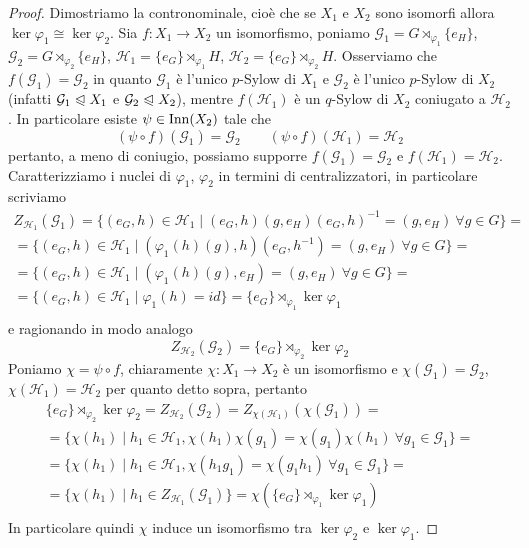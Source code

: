 \documentclass[11pt]{scrartcl}
\begin{document}
	\begin{proof}
		Dimostriamo la contronominale, cioè che se $X_1$ e $X_2$ sono isomorfi
		allora $\ker\varphi_1 \cong \ker\varphi_2$.\newline
		Sia $f: X_1\longrightarrow X_2$ un isomorfismo, poniamo $\mathcal{G}_1 = 
		G\rtimes_{\varphi_1}\{e_H\}$, $\mathcal{G}_2 = G\rtimes_{\varphi_2}\{e_H\}$,
		$\mathcal{H}_1 = \{e_G\}\rtimes_{\varphi_1}H$, $\mathcal{H}_2 = \{e_G\}\rtimes_{\varphi_2}H$.
		Osserviamo che $f(\mathcal{G}_1) = \mathcal{G}_2$ in quanto $\mathcal{G}_1$
		è l'unico $p$-Sylow di $X_1$ e $\mathcal{G}_2$ è l'unico $p$-Sylow di $X_2$
		(infatti $\mathcal{G}_1 \trianglelefteqslant X_1$ e $\mathcal{G}_2 
		\trianglelefteqslant X_2$), mentre $f(\mathcal{H}_1)$ è un $q$-Sylow di $X_2$
		coniugato a $\mathcal{H}_2$. In particolare esiste $\psi \in \operatorname{Inn}(X_2)$
		tale che
		\[
		(\psi\circ f)(\mathcal{G}_1) = \mathcal{G}_2 \qquad 
		(\psi\circ f)(\mathcal{H}_1) = \mathcal{H}_2
		\]
		pertanto, a meno di coniugio, possiamo supporre $f(\mathcal{G}_1) = \mathcal{G}_2$ e 
		$f(\mathcal{H}_1) = \mathcal{H}_2$. Caratterizziamo i nuclei di $\varphi_1$, 
		$\varphi_2$ in termini di centralizzatori, in particolare scriviamo
		\begin{multline*}
			Z_{\mathcal{H}_1}(\mathcal{G}_1) = \{(e_G, h) \in \mathcal{H}_1\mid
			(e_G, h)(g, e_H)(e_G, h)^{-1} = (g, e_H)~\forall g \in G\} = \\
			= \{(e_G, h)\in \mathcal{H}_1 \mid (\varphi_1(h)(g), h)(e_G, h^{-1})
			= (g, e_H)~\forall g \in G\} = \\
			= \{(e_G, h) \in \mathcal{H}_1\mid (\varphi_1(h)(g), e_H) = (g, e_H)~
			\forall g \in G\} = \\
			= \{(e_G, h) \in \mathcal{H}_1\mid \varphi_1(h) = id\} =
			\{e_G\}\rtimes_{\varphi_1}\ker\varphi_1\\
		\end{multline*}
		e ragionando in modo analogo
		\[
		Z_{\mathcal{H}_2}(\mathcal{G}_2) = \{e_G\}\rtimes_{\varphi_2}\ker\varphi_2
		\]
		Poniamo $\chi = \psi\circ f$, chiaramente $\chi: X_1\longrightarrow X_2$
		è un isomorfismo e $\chi(\mathcal{G}_1) = \mathcal{G}_2$, $\chi(\mathcal{H}_1)
		= \mathcal{H}_2$ per quanto detto sopra, pertanto
		\begin{multline*}
			\{e_G\}\rtimes_{\varphi_2}\ker\varphi_2 = Z_{\mathcal{H}_2}(\mathcal{G}_2) =
			Z_{\chi(\mathcal{H}_1)}(\chi(\mathcal{G}_1)) = \\
			= \{\chi(h_1) \mid h_1 \in \mathcal{H}_1, \chi(h_1)\chi(g_1) = 
			\chi(g_1)\chi(h_1)~\forall g_1 \in \mathcal{G}_1\} = \\
			= \{\chi(h_1)\mid h_1 \in \mathcal{H}_1, \chi(h_1g_1) = \chi(g_1h_1)
			~\forall g_1 \in \mathcal{G}_1\} = \\
			= \{\chi(h_1) \mid h_1 \in Z_{\mathcal{H}_1}(\mathcal{G}_1)\} = 
			\chi(\{e_G\}\rtimes_{\varphi_1}\ker\varphi_1)\\
		\end{multline*}
		In particolare quindi $\chi$ induce un isomorfismo tra $\ker\varphi_2$ e 
		$\ker\varphi_1$.
	\end{proof}
	
\end{document}
